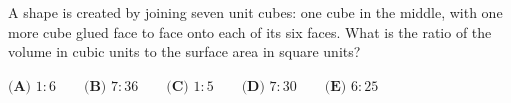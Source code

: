 A shape is created by joining seven unit cubes: one cube in the middle, with one more cube glued face to face onto each of its six faces. What is the ratio of the volume in cubic units to the surface area in square units?

$\textbf{(A) }1:6\qquad\textbf{(B) }7:36\qquad\textbf{(C) }1:5\qquad\textbf{(D) }7:30\qquad\textbf{(E) }6:25$
